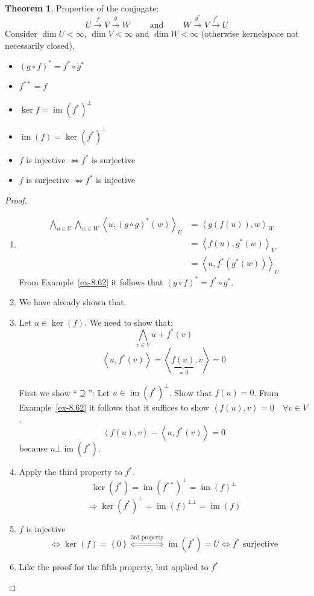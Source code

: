 \documentclass[a4paper,landscape,twocolumn]{article}
\newcommand\set[1]{\left\{#1\right\}}
\newcommand\functional[1]{\left\langle{#1}\right\rangle}
\theoremstyle{definition}
\newtheorem{theorem}{Theorem}
\DeclareMathOperator\image{im} %
\DeclareMathOperator\kernel{ker} %
\begin{document}
\begin{theorem}
  \label{satz-8.66}
  Properties of the conjugate:
  \[ U \overset{f}{\to} V \overset{g}{\to} W \qquad \text{ and } \qquad W \overset{g^*}{\to} V \overset{f^*}{\to} U \]
  Consider $\dim{U} < \infty$, $\dim{V} < \infty$ and $\dim{W} < \infty$ (otherwise kernelspace not necessarily closed).
  \begin{itemize}
    \item $(g \circ f)^* = f^* \circ g^*$
    \item $f^{**} = f$
    \item $\kernel{f} = \image(f^*)^\bot$
    \item $\image(f) = \kernel(f^*)^\bot$
    \item $f$ is injective $\Leftrightarrow f^*$ is surjective
    \item $f$ is surjective $\Leftrightarrow f^*$ is injective
  \end{itemize}
\end{theorem}

\begin{proof}
  \begin{enumerate}
    \item
      \begin{align*}
        \bigwedge_{u \in U} \bigwedge_{w \in W} \functional{u, (g \circ g)^*(w)}_U
          &= \functional{g(f(u)), w}_W \\
          &= \functional{f(u), g^*(w)}_V \\
          &= \functional{u, f^*(g^*(w))}_U
      \end{align*}
      From Example~\ref{ex-8.62} it follows that $(g \circ f)^* = f^* \circ g^*$.
    \item We have already shown that.
    \item Let $u \in \kernel(f)$.
      We need to show that:
      \[ \bigwedge_{v \in V} u + f^*(v) \]
      \[ \functional{u, f^*(v)} = \functional{\underbrace{f(u)}_{=0}, v} = 0 \]

      First we show \enquote{$\supseteq$}:
      Let $u \in \image(f^*)^\bot$. Show that $f(u) = 0$.
      From Example~\ref{ex-8.62} it follows that it suffices to show $\functional{f(u),v} = 0 \quad \forall v \in V$.
      \[ \functional{f(u), v} - \functional{u, f^*(v)} = 0 \]
      because $u \bot \image(f^*)$.
    \item Apply the third property to $f^*$.
      \[ \kernel(f^*) = \image(f^{**})^\bot = \image(f)^\bot \]
      \[ \Rightarrow \kernel(f^*)^\bot = \image(f)^{\bot \bot} = \image(f) \]
    \item
      $f$ is injective
      \[
        \Leftrightarrow \kernel(f) = \set{0}
        \overset{\text{3rd property}}{\Leftrightarrow} \image(f^*) = U
        \Leftrightarrow f^* \text{ surjective}
      \]
    \item Like the proof for the fifth property, but applied to $f^*$
  \end{enumerate}
\end{proof}
\end{document}
